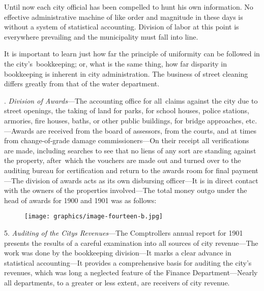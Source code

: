 \documentclass[openany,nobib]{tufte-book}
\begin{document}
Until now each city official has been compelled to hunt his own
information. No effective administrative machine of like order and
magnitude in these days is without a system of statistical accounting.
Division of labor at this point is everywhere prevailing and the
municipality must fall into line.~

It is important to learn just how far the principle of uniformity can be
followed in the city's~bookkeeping; or, what is the same thing, how far
disparity in bookkeeping is inherent in city administration. The
business of street cleaning differs greatly from that of the water
department.~

\vspace{.15in}

.\emph{ Division of Awards}---The accounting office for all~claims
against the city due to street openings, the taking of land for parks,
for school houses, police stations, armories, fire houses, baths, or
other public buildings, for bridge approaches, etc.---Awards are
received from the board of assessors, from the courts, and at times from
change-of-grade damage commissioners---On their receipt all
verifications are made, including searches to see that no liens of any
sort are standing against the property, after~which the vouchers are
made out and turned over to the auditing bureau for certification and
return to the awards room for final payment---The division of awards
acts as its own disbursing officer---It is in direct contact with the
owners of the properties involved---The total money outgo under the head
of awards for 1900 and 1901 was as follows:~

\begin{figure}
    \centering
    \texttt{[image: graphics/image-fourteen-b.jpg]}
    \label{fig:fig14a}
\end{figure}

5.\emph{ Auditing of the City\textquotesingle s Revenues}---The
Comptroller\textquotesingle s annual report for 1901 presents the
results of a careful examination into all sources of city revenue---The
work was done by the bookkeeping division---It marks a clear advance in
statistical accounting---It provides a comprehensive basis for auditing
the city's revenues, which was long a neglected feature of the Finance
Department---Nearly all departments, to a greater or less extent, are
receivers of city revenue.~
\end{document}
